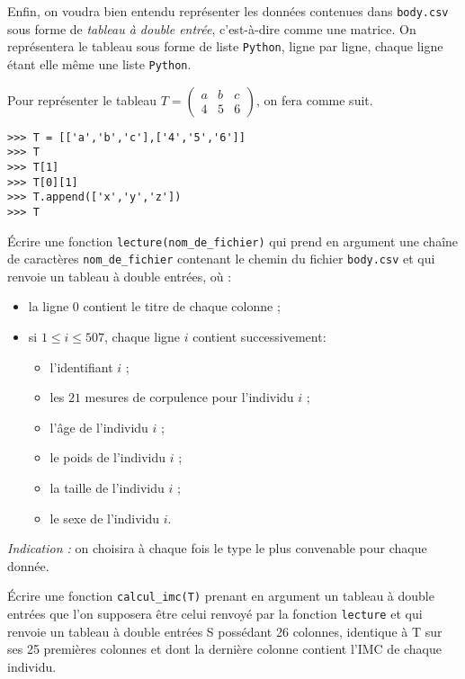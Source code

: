 Enfin, on voudra bien entendu représenter les données contenues dans \texttt{body.csv} sous forme de \emph{tableau à double entrée}, c'est-à-dire comme une matrice. On représentera le tableau sous forme de liste \texttt{Python}, ligne par ligne, chaque ligne étant elle même une liste \texttt{Python}.

\begin{exemple}
  Pour représenter le tableau $T = \begin{pmatrix} a & b & c \\ 4 & 5 & 6 \end{pmatrix}$, on fera comme suit. 
\begin{lstlisting}
>>> T = [['a','b','c'],['4','5','6']]
>>> T
>>> T[1]
>>> T[0][1]
>>> T.append(['x','y','z'])
>>> T
\end{lstlisting}
\end{exemple}


\question{} \label{qu.lecture} \'Ecrire une fonction \texttt{lecture(nom\_de\_fichier)} qui prend en argument une chaîne de caractères \texttt{nom\_de\_fichier} contenant le chemin du fichier \texttt{body.csv} et qui renvoie un tableau à double entrées, où :
\begin{itemize}
  \item[\textbullet] la ligne $0$ contient le titre de chaque colonne ;
  \item[\textbullet] si $1\leq i \leq 507$, chaque ligne $i$ contient successivement:
    \begin{itemize}
      \item l'identifiant $i$ ;
      \item les $21$ mesures de corpulence pour l'individu \no $i$ ;
      \item l'âge de l'individu \no $i$ ;
      \item le poids de l'individu \no $i$ ;
      \item la taille de l'individu \no $i$ ; 
      \item le sexe de l'individu \no $i$.
    \end{itemize}  
\end{itemize}


\emph{Indication :} on choisira à chaque fois le type le plus convenable pour chaque donnée. 

\question{}\label{qu.calcul_imc} Écrire une fonction \texttt{calcul\_imc(T)} prenant en argument un tableau à double entrées que l'on supposera être celui renvoyé par la fonction \texttt{lecture} et qui renvoie un tableau à double entrées S possédant 26 colonnes, identique à T sur ses 25 premières colonnes et dont la dernière colonne contient l'IMC de chaque individu.    

